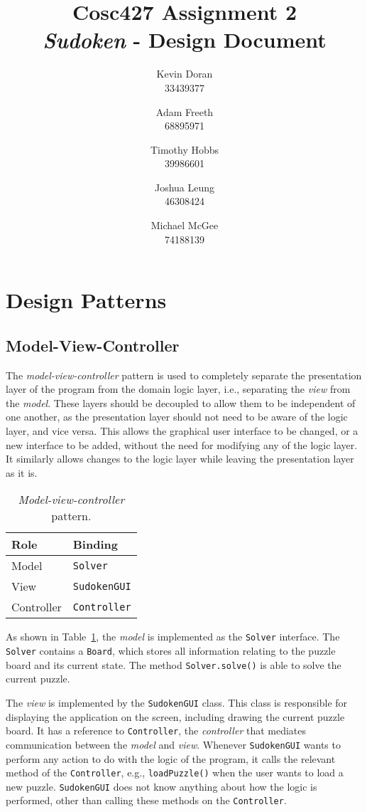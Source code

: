 \documentclass[a4paper, 11pt]{article}
\title{\textbf{Cosc427 Assignment 2} \\ {\textit{Sudoken} - Design Document}}
\author{
	Kevin Doran    \\ 33439377 \and
	Adam Freeth    \\ 68895971 \and
	Timothy Hobbs  \\ 39986601 \and
	Joshua Leung   \\ 46308424 \and
	Michael McGee  \\ 74188139
}
\begin{document}
\maketitle


\section{Design Patterns}

\subsection{Model-View-Controller}

The \textit{model-view-controller} pattern is used to completely separate the presentation layer of the program from the domain logic layer, i.e., separating the \textit{view} from the \textit{model}. These layers should be decoupled to allow them to be independent of one another, as the presentation layer should not need to be aware of the logic layer, and vice versa. This allows the graphical user interface to be changed, or a new interface to be added, without the need for modifying any of the logic layer. It similarly allows changes to the logic layer while leaving the presentation layer as it is.

\begin{table}[h!]
\centering
\begin{tabular}{l l}
\textbf{Role} & \textbf{Binding} \\ \hline
Model         & \texttt{Solver} \\
View          & \texttt{SudokenGUI} \\
Controller    & \texttt{Controller} \\
\end{tabular}
\caption{\textit{Model-view-controller} pattern.}
\label{table:mvc}
\end{table}

As shown in Table~\ref{table:mvc}, the \textit{model} is implemented as the \texttt{Solver} interface. The \texttt{Solver} contains a \texttt{Board}, which stores all information relating to the puzzle board and its current state. The method \texttt{Solver.solve()} is able to solve the current puzzle.

The \textit{view} is implemented by the \texttt{SudokenGUI} class. This class is responsible for displaying the application on the screen, including drawing the current puzzle board. It has a reference to \texttt{Controller}, the \textit{controller} that mediates communication between the \textit{model} and \textit{view}. Whenever \texttt{SudokenGUI} wants to perform any action to do with the logic of the program, it calls the relevant method of the \texttt{Controller}, e.g., \texttt{loadPuzzle()} when the user wants to load a new puzzle. \texttt{SudokenGUI} does not know anything about how the logic is performed, other than calling these methods on the \texttt{Controller}.
\end{document}

